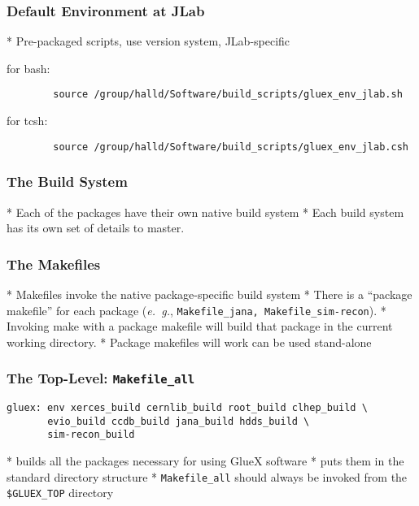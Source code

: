 \documentclass[xcolor=dvipsnames,hyperref={pdfpagelabels=false}]{beamer}
\begin{document}
\begin{frame}[fragile]
  \frametitle{Default Environment at JLab}

* Pre-packaged scripts, use version system, JLab-specific

for bash:
\begin{verbatim}
        source /group/halld/Software/build_scripts/gluex_env_jlab.sh
\end{verbatim}
for tcsh:
\begin{verbatim}
        source /group/halld/Software/build_scripts/gluex_env_jlab.csh
\end{verbatim}

\end{frame}

\begin{frame}\frametitle{The Build System}

* Each of the packages have their own native build system
* Each build system has its own set of details to master.

\end{frame}\begin{frame}\frametitle{The Makefiles}

* Makefiles invoke the native package-specific build system
* There is a ``package makefile'' for each package ({\it e.~g.}, {\tt Makefile\_jana, Makefile\_sim-recon}).
* Invoking make with a package makefile will build that package in the current working directory.
* Package makefiles will work can be used stand-alone

\end{frame}
\begin{frame}[fragile]
  \frametitle{The Top-Level: {\tt Makefile\_all}}

\begin{verbatim}
gluex: env xerces_build cernlib_build root_build clhep_build \
       evio_build ccdb_build jana_build hdds_build \
       sim-recon_build
\end{verbatim}

* builds all the packages necessary for using GlueX software
* puts them in the standard directory structure
* {{\tt Makefile\_all}} should always be invoked from the {\tt \$GLUEX\_TOP} directory

\end{frame}
\end{document}
